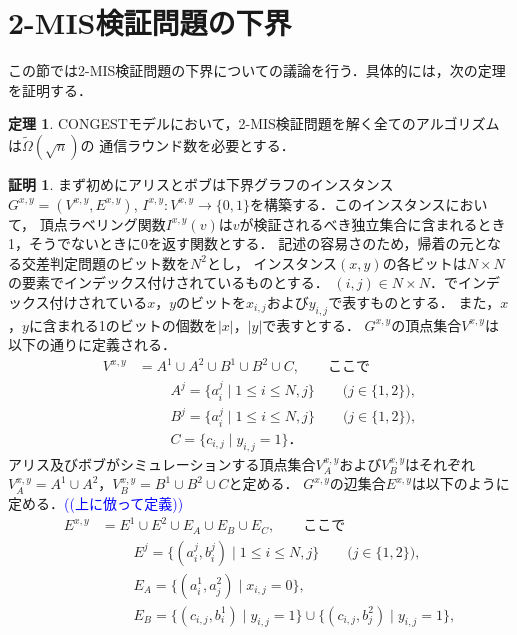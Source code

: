 \documentclass[12pt]{thesis}
\newcommand{\Izumi}[1]{\textcolor{blue}{(#1)}}
\newcommand{\CONGEST}{\textsf{CONGEST}}
\theoremstyle{definition}
\newtheorem{theorem}{定理}[chapter]
\newtheorem*{prf*}{証明}
\begin{document}
\section{2-MIS検証問題の下界}
この節では2-MIS検証問題の下界についての議論を行う．具体的には，次の定理を証明する．
\begin{theorem}
{\CONGEST}モデルにおいて，2-MIS検証問題を解く全てのアルゴリズムは$\tilde{\Omega} (\sqrt{n})$の
通信ラウンド数を必要とする．
\end{theorem}
\begin{prf*}
まず初めにアリスとボブは下界グラフのインスタンス$G^{x,y} = (V^{x,y}, E^{x,y})$, 
$I^{x,y} : V^{x,y} \to \{0, 1\}$を構築する．このインスタンスにおいて，
頂点ラベリング関数$I^{x,y}(v)$は$v$が検証されるべき独立集合に含まれるとき1，そうでないときに0を返す関数とする．
記述の容易さのため，帰着の元となる交差判定問題のビット数を$N^2$とし，
インスタンス$(x, y)$の各ビットは$N\times N$の要素でインデックス付けされているものとする．
$(i, j) \in N \times N$．でインデックス付けされている$x$，$y$のビットを$x_{i,j}$および$y_{i,j}$で表すものとする．
また，$x$，$y$に含まれる1のビットの個数を$|x|$，$|y|$で表すとする．
$G^{x,y}$の頂点集合$V^{x,y}$は以下の通りに定義される．
\begin{align*}
V^{x,y} &= A^{1} \cup A^{2} \cup B^{1} \cup B^{2} \cup C, \quad \quad \text{ここで}\\
&\phantom{=} \quad A^{j} = \{a^{j}_{i} \mid 1\leq i \leq N, j\} \quad \quad \text{($j \in \{1, 2\}$)}, \\
&\phantom{=} \quad B^{j} = \{a^{j}_{i} \mid 1\leq i \leq N, j\} \quad \quad \text{($j \in \{1, 2\}$)}, \\
&\phantom{=} \quad C = \{c_{i,j} \mid y_{i,j} = 1\}．
\end{align*}
アリス及びボブがシミュレーションする頂点集合$V^{x,y}_{A}$および$V^{x,y}_{B}$はそれぞれ
$V^{x,y}_{A} = A^{1} \cup A^{2}$，$V^{x,y}_{B} = B^{1} \cup B^{2} \cup C$と定める．
$G^{x,y}$の辺集合$E^{x,y}$は以下のように定める．\Izumi{(上に倣って定義)}
\begin{align*}
E^{x,y} &= E^{1} \cup E^{2} \cup E_{A} \cup E_{B} \cup E_{C}, \quad \quad \text{ここで}\\
&\phantom{=} \quad E^{j} = \{(a^{j}_{i}, b^{j}_{i}) \mid 1\leq i \leq N, j\} \quad \quad \text{($j \in \{1, 2\}$)}, \\
&\phantom{=} \quad E_{A} = \{(a^{1}_{i},a^{2}_{j}) \mid x_{i,j}=0\}, \\
&\phantom{=} \quad E_{B} = \{(c_{i,j},b^{1}_{i}) \mid y_{i,j}=1\} \cup \{(c_{i,j},b^{2}_{j}) \mid y_{i,j}=1\}, \\

\end{align*}
\end{prf*}
\end{document}
